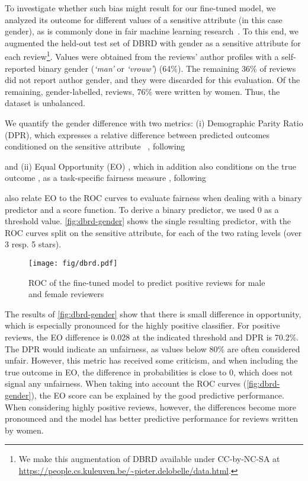 \documentclass[11pt,a4paper]{article}
\begin{document}
To investigate whether such bias might result for our fine-tuned model, we analyzed its outcome for different values of a sensitive attribute (in this case gender), as is commonly done in fair machine learning research~\citep{zemel2013learning, hardtEqualityOpportunitySupervised2016, delobelleEthical2020}.
To this end, we augmented the held-out test set of DBRD with gender as a sensitive attribute for each review\footnote{We make this augmentation of DBRD available under CC-by-NC-SA at \url{https://people.cs.kuleuven.be/~pieter.delobelle/data.html}.}.
Values were obtained from the reviews' author profiles with a self-reported binary gender (\emph{`man'} or \emph{`vrouw'}) (64\%). The remaining 36\% of reviews did not report 
author
gender, and they were discarded for this evaluation.
Of the remaining, gender-labelled, reviews, 76\% were written by women.
Thus, the dataset is unbalanced.

We quantify the gender difference with two metrics: (i) Demographic Parity Ratio (DPR), which expresses a relative difference between predicted outcomes  conditioned on the sensitive attribute ~\citep{dworkFairnessAwareness2012}, following



and (ii) Equal Opportunity (EO) \citet{hardtEqualityOpportunitySupervised2016}, 
which in addition also conditions on the true outcome ,
as a task-specific fairness
measure \citep{dworkFairnessAwareness2012}, following 


\citet{hardtEqualityOpportunitySupervised2016} also relate EO to the ROC curves to evaluate fairness when dealing with a binary predictor and a score function.
To derive a binary predictor, 
we used 0 as a threshold value. \autoref{fig:dbrd-gender} shows the single resulting predictor, with the ROC curves split on the sensitive attribute, for each of the two rating levels (over 3 resp. 5 stars). 


\begin{figure}[t]
    \centering
    \texttt{[image: fig/dbrd.pdf]}
    \caption{ROC of the fine-tuned model to predict positive reviews for male and female reviewers}
    \label{fig:dbrd-gender}
\end{figure}


The results of \autoref{fig:dbrd-gender} show that there is small difference in opportunity,
which is especially pronounced for the highly positive classifier.
For positive reviews, the EO difference is 0.028 at the indicated threshold and DPR is 70.2\%.
The DPR would indicate an 
unfairness, as values below 80\% are often considered unfair.
However, this metric has received some 
criticism,
and when including the true outcome in EO, the difference in probabilities is close to 0,
which does not signal any unfairness.
When taking into account the ROC curves (\autoref{fig:dbrd-gender}), the EO score can be explained by the good predictive performance. 
When considering highly positive reviews, however, the differences become more pronounced and the model has better predictive performance for reviews written by women. 
\end{document}
